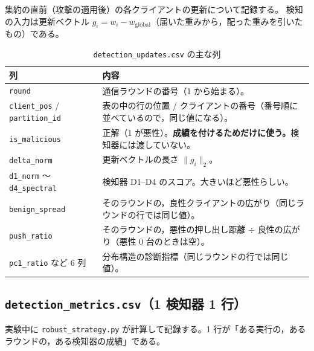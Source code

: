 \documentclass[a4j, dvipdfmx]{jsarticle}  %
\begin{document}
集約の直前（攻撃の適用後）の各クライアントの更新について記録する。
検知の入力は更新ベクトル $g_i = w_i - w_{\text{global}}$（届いた重みから，配った重みを引いたもの）である。

\begin{table}[H]
\centering
\caption{\texttt{detection\_updates.csv} の主な列}
\begin{tabular}{@{}P{4.4cm} P{10.9cm}@{}}
\toprule
列 & 内容 \\
\midrule
\texttt{round} & 通信ラウンドの番号（1 から始まる）。 \\
\texttt{client\_pos} / \texttt{partition\_id} & 表の中の行の位置 / クライアントの番号（番号順に並べているので，同じ値になる）。 \\
\texttt{is\_malicious} & 正解（1 が悪性）。\textbf{成績を付けるためだけに使う。}検知器には渡していない。 \\
\texttt{delta\_norm} & 更新ベクトルの長さ $\|g_i\|_2$。 \\
\texttt{d1\_norm} 〜 \texttt{d4\_spectral} & 検知器 D1--D4 のスコア。大きいほど悪性らしい。 \\
\texttt{benign\_spread} & そのラウンドの，良性クライアントの広がり（同じラウンドの行では同じ値）。 \\
\texttt{push\_ratio} & そのラウンドの，悪性の押し出し距離 $\div$ 良性の広がり（悪性 0 台のときは空）。 \\
\texttt{pc1\_ratio} など 6 列 & 分布構造の診断指標（同じラウンドの行では同じ値）。 \\
\bottomrule
\end{tabular}
\end{table}

\subsection{\texttt{detection\_metrics.csv}（1 検知器 1 行）}

実験中に \texttt{robust\_strategy.py} が計算して記録する。1 行が「ある実行の，あるラウンドの，ある検知器の成績」である。
\end{document}
